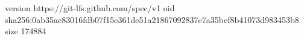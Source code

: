 version https://git-lfs.github.com/spec/v1
oid sha256:0ab35ac83016fdb07f15e361de51a21867092837e7a35bef8b41073d983453b8
size 174884
